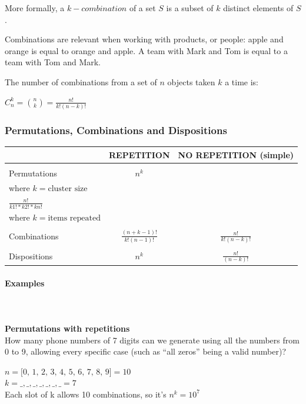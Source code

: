 \documentclass{article}
\begin{document}
More formally, a $k-combination$ of a set $S$ is a subset of $k$ distinct elements of $S$.

Combinations are relevant when working with products, or people: apple and orange is equal to orange and apple. A team with Mark and Tom is equal to a team with Tom and Mark.

The number of combinations from a set of $n$ objects taken $k$ a time is:

$\displaystyle C _n ^k = \binom{n}{k} = \frac{n!}{k!(n - k)!}$

\subsubsection{Permutations, Combinations and Dispositions}
\begin{center}
\begin{tabular}{|m{2cm}|c|c|}
\hline
& REPETITION & NO REPETITION (simple) \\ \hline
&&\\[-1em]
Permutations & $\displaystyle n^k$ & \makecell{$\displaystyle \frac{n!}{(n - k)!}$ \\[15pt] where $k = \text{cluster size}$ \\[15pt] $\displaystyle \frac{n!}{k1! * k2! * kn!}$ \\[15pt] where $k = \text{items repeated}$} \\[50pt] \hline
&&\\[-1em]
Combinations & $\displaystyle \frac{(n + k - 1)!}{k!(n - 1)!}$ & $\displaystyle \frac{n!}{k!(n - k)!}$ \\[25pt] \hline
&&\\[-1em]
Dispositions & $\displaystyle n^k$ & $\displaystyle \frac{n!}{(n - k)!}$ \\[25pt] 
\hline
\end{tabular}
\end{center}

\paragraph{Examples}\mbox{} \\
\mbox{} \\
\textbf{Permutations with repetitions} \\ 
How many phone numbers of 7 digits can we generate using all the numbers from 0 to 9, allowing every specific case (such as “all zeros” being a valid number)?

$n = \text{[0, 1, 2, 3, 4, 5, 6, 7, 8, 9]} = 10$ \\
$k = \_, \_, \_, \_, \_, \_, \_ = 7$ \\ 
Each slot of k allows 10 combinations, so it’s $n^k = 10^7$
\end{document}
